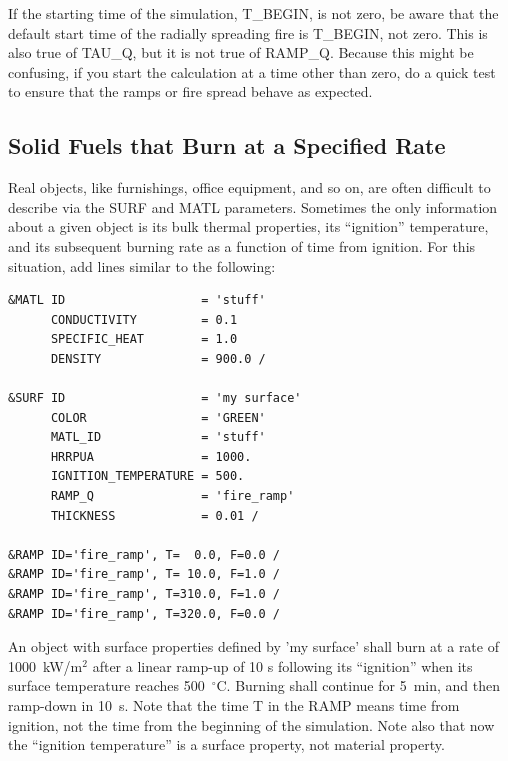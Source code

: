 \documentclass[11pt]{book}
\begin{document}
If the starting time of the simulation, {\ct T\_BEGIN}, is not zero, be aware that the default start time of the radially spreading fire is {\ct T\_BEGIN}, not zero. This is also true of {\ct TAU\_Q}, but it is not true of {\ct RAMP\_Q}. Because this might be confusing, if you start the calculation at a time other than zero, do a quick test to ensure that the ramps or fire spread behave as expected.



\subsection{Solid Fuels that Burn at a Specified Rate}
\label{info:specified_burning}

Real objects, like furnishings, office equipment, and so on, are
often difficult to describe via the {\ct SURF} and {\ct MATL}
parameters. Sometimes the only information about a given object is its
bulk thermal properties, its ``ignition'' temperature, and its
subsequent burning rate as a function of time from ignition. For
this situation, add lines similar to the following:
\begin{lstlisting}
&MATL ID                   = 'stuff'
      CONDUCTIVITY         = 0.1
      SPECIFIC_HEAT        = 1.0
      DENSITY              = 900.0 /

&SURF ID                   = 'my surface'
      COLOR                = 'GREEN'
      MATL_ID              = 'stuff'
      HRRPUA               = 1000.
      IGNITION_TEMPERATURE = 500.
      RAMP_Q               = 'fire_ramp'
      THICKNESS            = 0.01 /

&RAMP ID='fire_ramp', T=  0.0, F=0.0 /
&RAMP ID='fire_ramp', T= 10.0, F=1.0 /
&RAMP ID='fire_ramp', T=310.0, F=1.0 /
&RAMP ID='fire_ramp', T=320.0, F=0.0 /
\end{lstlisting}
An object with surface properties defined by {\ct 'my surface'} shall
burn at a rate of 1000~kW/m$^2$ after a linear ramp-up of 10 s
following its ``ignition'' when its surface temperature reaches
500~$^\circ$C. Burning shall continue for 5~min, and then ramp-down
in 10~s. Note that the time {\ct T} in the {\ct RAMP} means time from
ignition, not the time from the beginning of the simulation. Note also that now the ``ignition temperature'' is a surface
property, not material property.
\end{document}
